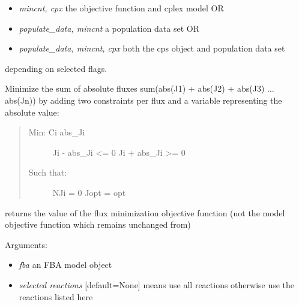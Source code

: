 \documentclass[a4paper,11pt,english]{sphinxmanual}
\begin{document}
\begin{fulllineitems}
\begin{itemize}
\item {} 
\emph{mincnt, cpx} the objective function and cplex model OR

\item {} 
\emph{populate\_data, mincnt} a population data set OR

\item {} 
\emph{populate\_data, mincnt, cpx} both the cps object and population data set

\end{itemize}

depending on selected flags.

\end{fulllineitems}


\begin{fulllineitems}
\label{modules_doc:cbmpy.CBCPLEX.cplx_MinimizeSumOfAbsFluxes}
Minimize the sum of absolute fluxes sum(abs(J1) + abs(J2) + abs(J3) ... abs(Jn)) by adding two constraints per flux
and a variable representing the absolute value:
\begin{quote}
\begin{description}
\item[{Min: Ci abs\_Ji}] \leavevmode
Ji - abs\_Ji \textless{}= 0
Ji + abs\_Ji \textgreater{}= 0

\item[{Such that:}] \leavevmode
NJi = 0
Jopt = opt

\end{description}
\end{quote}

returns the value of the flux minimization objective function (not the model objective function which remains unchanged from)

Arguments:
\begin{itemize}
\item {} 
\emph{fba} an FBA model object

\item {} 
\emph{selected reactions} {[}default=None{]} means use all reactions otherwise use the reactions listed here


\end{itemize}
\end{fulllineitems}
\end{document}

